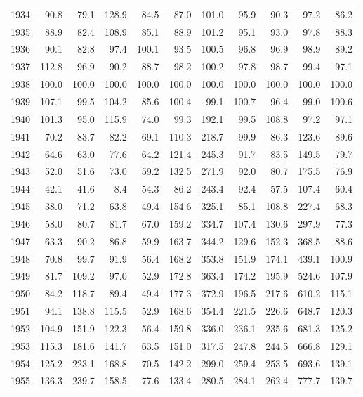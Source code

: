 \begin{longtable}{r*{10}{r}}
1934 & 90.8 & 79.1 & 128.9 & 84.5 & 87.0 & 101.0 & 95.9 & 90.3 & 97.2 & 86.2 \\
1935 & 88.9 & 82.4 & 108.9 & 85.1 & 88.9 & 101.2 & 95.1 & 93.0 & 97.8 & 88.3 \\
1936 & 90.1 & 82.8 & 97.4 & 100.1 & 93.5 & 100.5 & 96.8 & 96.9 & 98.9 & 89.2 \\
1937 & 112.8 & 96.9 & 90.2 & 88.7 & 98.2 & 100.2 & 97.8 & 98.7 & 99.4 & 97.1 \\
1938 & 100.0 & 100.0 & 100.0 & 100.0 & 100.0 & 100.0 & 100.0 & 100.0 & 100.0 & 100.0 \\
1939 & 107.1 & 99.5 & 104.2 & 85.6 & 100.4 & 99.1 & 100.7 & 96.4 & 99.0 & 100.6 \\
1940 & 101.3 & 95.0 & 115.9 & 74.0 & 99.3 & 192.1 & 99.5 & 108.8 & 97.2 & 97.1 \\
1941 & 70.2 & 83.7 & 82.2 & 69.1 & 110.3 & 218.7 & 99.9 & 86.3 & 123.6 & 89.6 \\
1942 & 64.6 & 63.0 & 77.6 & 64.2 & 121.4 & 245.3 & 91.7 & 83.5 & 149.5 & 79.7 \\
1943 & 52.0 & 51.6 & 73.0 & 59.2 & 132.5 & 271.9 & 92.0 & 80.7 & 175.5 & 76.9 \\
1944 & 42.1 & 41.6 & 8.4 & 54.3 & 86.2 & 243.4 & 92.4 & 57.5 & 107.4 & 60.4 \\
1945 & 38.0 & 71.2 & 63.8 & 49.4 & 154.6 & 325.1 & 85.1 & 108.8 & 227.4 & 68.3 \\
1946 & 58.0 & 80.7 & 81.7 & 67.0 & 159.2 & 334.7 & 107.4 & 130.6 & 297.9 & 77.3 \\
1947 & 63.3 & 90.2 & 86.8 & 59.9 & 163.7 & 344.2 & 129.6 & 152.3 & 368.5 & 88.6 \\
1948 & 70.8 & 99.7 & 91.9 & 56.4 & 168.2 & 353.8 & 151.9 & 174.1 & 439.1 & 100.9 \\
1949 & 81.7 & 109.2 & 97.0 & 52.9 & 172.8 & 363.4 & 174.2 & 195.9 & 524.6 & 107.9 \\
1950 & 84.2 & 118.7 & 89.4 & 49.4 & 177.3 & 372.9 & 196.5 & 217.6 & 610.2 & 115.1 \\
1951 & 94.1 & 138.8 & 115.5 & 52.9 & 168.6 & 354.4 & 221.5 & 226.6 & 648.7 & 120.3 \\
1952 & 104.9 & 151.9 & 122.3 & 56.4 & 159.8 & 336.0 & 236.1 & 235.6 & 681.3 & 125.2 \\
1953 & 115.3 & 181.6 & 141.7 & 63.5 & 151.0 & 317.5 & 247.8 & 244.5 & 666.8 & 129.1 \\
1954 & 125.2 & 223.1 & 168.8 & 70.5 & 142.2 & 299.0 & 259.4 & 253.5 & 693.6 & 139.1 \\
1955 & 136.3 & 239.7 & 158.5 & 77.6 & 133.4 & 280.5 & 284.1 & 262.4 & 777.7 & 139.7 \\

\end{longtable}
